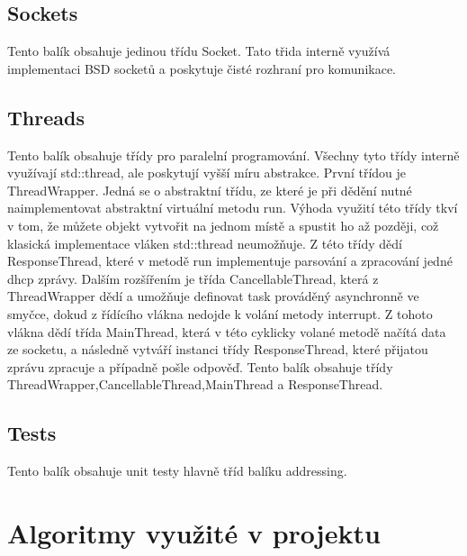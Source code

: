 \documentclass[12pt,a4paper]{report}
\begin{document}
\section*{Sockets}
Tento balík obsahuje jedinou třídu Socket. Tato třida interně využívá implementaci BSD socketů a poskytuje čisté rozhraní pro komunikace. 
\section*{Threads}
Tento balík obsahuje třídy pro paralelní programování. Všechny tyto třídy interně využívají std::thread, ale poskytují vyšší míru abstrakce. První třídou je ThreadWrapper. Jedná se o abstraktní třídu, ze které je při dědění nutné naimplementovat abstraktní virtuální metodu run. Výhoda využití této třídy tkví v tom, že můžete objekt vytvořit na jednom místě a spustit ho až později, což klasická implementace vláken std::thread neumožňuje. Z této třídy dědí ResponseThread, které v metodě run implementuje parsování a zpracování jedné dhcp zprávy. Dalším rozšířením je třída CancellableThread, která z ThreadWrapper dědí a umožňuje definovat task prováděný asynchronně ve smyčce, dokud z řídícího vlákna nedojde k volání metody interrupt. Z tohoto vlákna dědí třída MainThread, která v této cyklicky volané metodě načítá data ze socketu,  a následně vytváří instanci třídy ResponseThread, které přijatou zprávu zpracuje a případně pošle odpověď.
Tento balík obsahuje třídy ThreadWrapper,CancellableThread,MainThread a ResponseThread.
\section*{Tests}
Tento balík obsahuje unit testy hlavně tříd balíku  addressing.
\chapter{Algoritmy využité v projektu}
\end{document}
